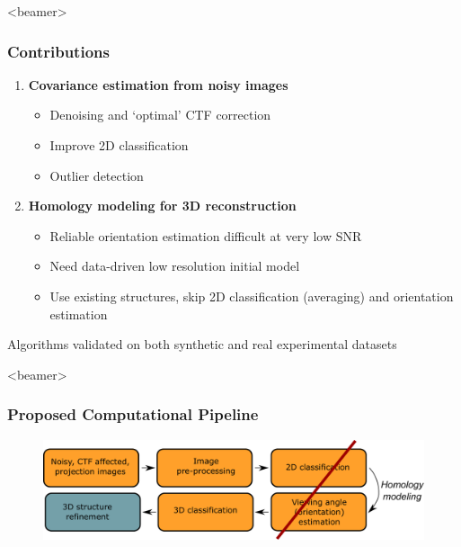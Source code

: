 \documentclass{beamer}
\begin{document}
\begin{frame}<beamer>
\frametitle{Contributions}
\begin{enumerate}
\item \textbf{Covariance estimation from noisy images}
\begin{itemize}
\item Denoising and `optimal' CTF correction
\item Improve 2D classification
\item Outlier detection
\end{itemize}
\item \textbf{Homology modeling for 3D reconstruction}
\begin{itemize}
\item Reliable orientation estimation difficult at very low SNR
\item Need data-driven low resolution initial model
\item Use existing structures, \alert{skip 2D classification (averaging) and orientation estimation}
\end{itemize}
\end{enumerate}
Algorithms validated on both synthetic and real experimental datasets
\end{frame}

\begin{frame}<beamer>
\frametitle{Proposed Computational Pipeline}
\begin{figure}[h]
\centering
{\includegraphics[scale=0.35]{figures/cryoem_pipeline_ours.pdf}}\\
\label{fig:rawims}
\end{figure}
\end{frame}
\end{document}
